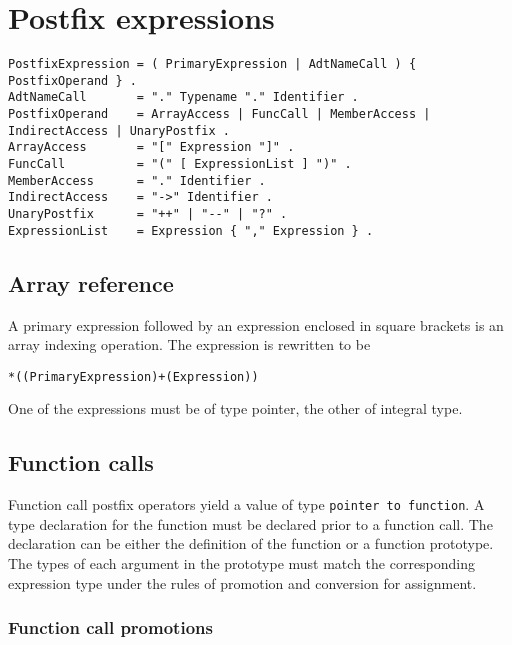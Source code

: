 \hypertarget{postfix-expressions}{%
\section{Postfix expressions}\label{postfix-expressions}}

\begin{lstlisting}
PostfixExpression = ( PrimaryExpression | AdtNameCall ) { PostfixOperand } .
AdtNameCall       = "." Typename "." Identifier .
PostfixOperand    = ArrayAccess | FuncCall | MemberAccess | IndirectAccess | UnaryPostfix .
ArrayAccess       = "[" Expression "]" .
FuncCall          = "(" [ ExpressionList ] ")" .
MemberAccess      = "." Identifier .
IndirectAccess    = "->" Identifier .
UnaryPostfix      = "++" | "--" | "?" .
ExpressionList    = Expression { "," Expression } .
\end{lstlisting}

\hypertarget{array-reference}{%
\subsection{Array reference}\label{array-reference}}

A primary expression followed by an expression enclosed in square
brackets is an array indexing operation. The expression is rewritten to
be

\begin{lstlisting}
*((PrimaryExpression)+(Expression))
\end{lstlisting}

One of the expressions must be of type pointer, the other of integral
type.

\hypertarget{function-calls}{%
\subsection{Function calls}\label{function-calls}}

Function call postfix operators yield a value of type
\passthrough{\lstinline!pointer to function!}. A type declaration for
the function must be declared prior to a function call. The declaration
can be either the definition of the function or a function prototype.
The types of each argument in the prototype must match the corresponding
expression type under the rules of promotion and conversion for
assignment.

\hypertarget{function-call-promotions}{%
\subsubsection{Function call
promotions}\label{function-call-promotions}}

